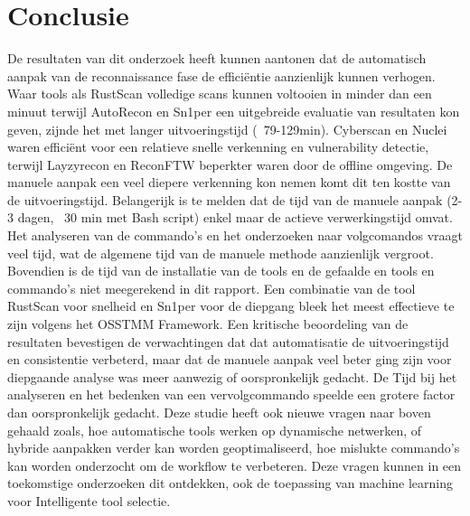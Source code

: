 
\chapter{Conclusie}%
\label{ch:conclusie}


De resultaten van dit onderzoek heeft kunnen aantonen dat de automatisch aanpak van de reconnaissance fase de efficiëntie aanzienlijk kunnen verhogen.
Waar tools als RustScan volledige scans kunnen voltooien in minder dan een minuut terwijl AutoRecon en Sn1per een uitgebreide evaluatie van resultaten kon geven, zijnde het met langer uitvoeringstijd (~79-129min).
Cyberscan en Nuclei waren efficiënt voor een relatieve snelle verkenning en vulnerability detectie, terwijl Layzyrecon en ReconFTW beperkter waren door de offline omgeving.
De manuele aanpak een veel diepere verkenning kon nemen komt dit ten kostte van de uitvoeringstijd.
Belangerijk is te melden dat de tijd van de manuele aanpak (2-3 dagen, ~30 min met Bash script) enkel maar de actieve verwerkingstijd omvat.
Het analyseren van de commando's en het onderzoeken naar volgcomandos vraagt veel tijd, wat de algemene tijd van de manuele methode aanzienlijk vergroot.
Bovendien is de tijd van de installatie van de tools en de gefaalde en tools en commando's niet meegerekend in dit rapport.
Een combinatie van de tool RustScan voor snelheid en Sn1per voor de diepgang bleek het meest effectieve te zijn volgens het OSSTMM Framework.
Een kritische beoordeling van de resultaten bevestigen de verwachtingen dat dat automatisatie de uitvoeringstijd en consistentie verbeterd, maar dat de manuele aanpak veel beter ging zijn voor diepgaande analyse was meer aanwezig of oorspronkelijk gedacht.
De Tijd bij het analyseren en het bedenken van een vervolgcommando speelde een grotere factor dan oorspronkelijk gedacht.
Deze studie heeft ook nieuwe vragen naar boven gehaald zoals, hoe automatische tools werken op dynamische netwerken, of hybride aanpakken verder kan worden geoptimaliseerd, hoe mislukte commando's kan worden onderzocht om de workflow te verbeteren.
Deze vragen kunnen in een toekomstige onderzoeken dit ontdekken, ook de toepassing van machine learning voor Intelligente tool selectie.